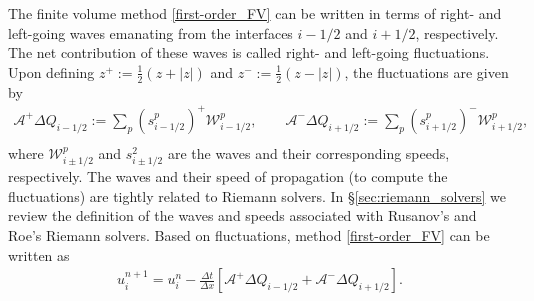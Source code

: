 \documentclass[preprint, 11pt]{article}
\newcommand{\W}{{\mathcal W}}
\newcommand{\A}{{\mathcal A}}
\newcommand{\apdq}{\A^+ \!\!{\Delta} Q}
\newcommand{\amdq}{\A^- \!\!{\Delta} Q}
\newcommand{\imh}{{i-1/2}}
\newcommand{\iph}{{i+1/2}}
\begin{document}
The finite volume method \eqref{first-order_FV} can be written in terms of right-
and left-going waves emanating from the interfaces $i-1/2$ and $i+1/2$, respectively.
The net contribution of these waves is called right- and left-going fluctuations.
Upon defining $z^+:=\frac{1}{2}(z+|z|)$ and $z^-:=\frac{1}{2}(z-|z|)$,
the fluctuations are given by
\begin{align}\label{fluct}
  \apdq_\imh := \sum_p\left(s_{i-1/2}^p\right)^+\W_{i-1/2}^p, \qquad
  \amdq_\iph := \sum_p\left(s_{i+1/2}^p\right)^-\W_{i+1/2}^p, \\
\end{align}
where $\W_{i\pm 1/2}^p$ and $s_{i\pm 1/2}^2$ are the waves and their corresponding speeds, respectively.
The waves and their speed of propagation (to compute the fluctuations) are tightly related to Riemann solvers.
In \S\ref{sec:riemann_solvers} we review the definition of the waves and speeds associated with
Rusanov's and Roe's Riemann solvers.
Based on fluctuations, method \eqref{first-order_FV} can be written as
\begin{align}\label{first-order_via_fluct}
  u_i^{n+1}=u_i^n-\frac{\Delta t}{\Delta x}\left[\apdq_\imh+\amdq_\iph\right].
\end{align}
\end{document}
